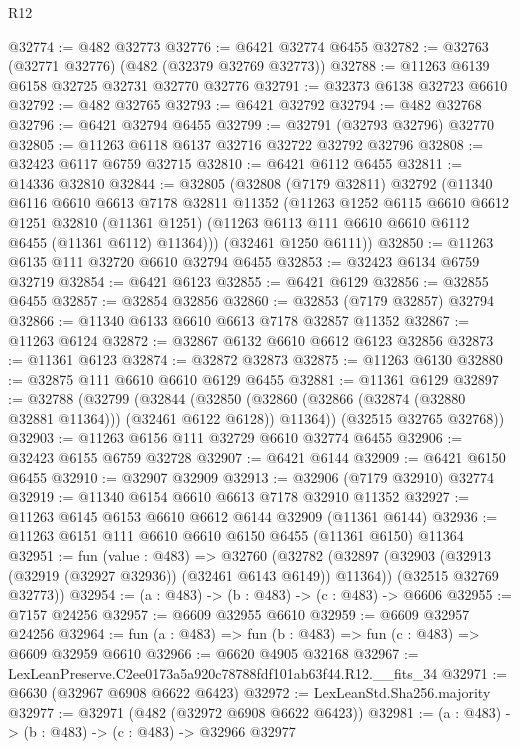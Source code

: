 \begin{lexlean}{R12}
\begin{coremodule}
@32774 := @482 @32773
@32776 := @6421 @32774 @6455
@32782 := @32763 (@32771 @32776) (@482 (@32379 @32769 @32773))
@32788 := @11263 @6139 @6158 @32725 @32731 @32770 @32776
@32791 := @32373 @6138 @32723 @6610
@32792 := @482 @32765
@32793 := @6421 @32792
@32794 := @482 @32768
@32796 := @6421 @32794 @6455
@32799 := @32791 (@32793 @32796) @32770
@32805 := @11263 @6118 @6137 @32716 @32722 @32792 @32796
@32808 := @32423 @6117 @6759 @32715
@32810 := @6421 @6112 @6455
@32811 := @14336 @32810
@32844 := @32805
    (@32808
      (@7179 @32811)
      @32792
      (@11340
        @6116
        @6610
        @6613
        @7178
        @32811
        @11352
        (@11263
          @1252
          @6115
          @6610
          @6612
          @1251
          @32810
          (@11361 @1251)
          (@11263 @6113 @111 @6610 @6610 @6112 @6455 (@11361 @6112) @11364)))
      (@32461 @1250 @6111))
@32850 := @11263 @6135 @111 @32720 @6610 @32794 @6455
@32853 := @32423 @6134 @6759 @32719
@32854 := @6421 @6123
@32855 := @6421 @6129
@32856 := @32855 @6455
@32857 := @32854 @32856
@32860 := @32853 (@7179 @32857) @32794
@32866 := @11340 @6133 @6610 @6613 @7178 @32857 @11352
@32867 := @11263 @6124
@32872 := @32867 @6132 @6610 @6612 @6123 @32856
@32873 := @11361 @6123
@32874 := @32872 @32873
@32875 := @11263 @6130
@32880 := @32875 @111 @6610 @6610 @6129 @6455
@32881 := @11361 @6129
@32897 := @32788
    (@32799
      (@32844
        (@32850 (@32860 (@32866 (@32874 (@32880 @32881 @11364))) (@32461 @6122 @6128)) @11364))
      (@32515 @32765 @32768))
@32903 := @11263 @6156 @111 @32729 @6610 @32774 @6455
@32906 := @32423 @6155 @6759 @32728
@32907 := @6421 @6144
@32909 := @6421 @6150 @6455
@32910 := @32907 @32909
@32913 := @32906 (@7179 @32910) @32774
@32919 := @11340 @6154 @6610 @6613 @7178 @32910 @11352
@32927 := @11263 @6145 @6153 @6610 @6612 @6144 @32909 (@11361 @6144)
@32936 := @11263 @6151 @111 @6610 @6610 @6150 @6455 (@11361 @6150) @11364
@32951 := fun (value : @483) =>
  @32760
    (@32782
      (@32897 (@32903 (@32913 (@32919 (@32927 @32936)) (@32461 @6143 @6149)) @11364))
      (@32515 @32769 @32773))
@32954 := (a : @483) -> (b : @483) -> (c : @483) -> @6606
@32955 := @7157 @24256
@32957 := @6609 @32955 @6610
@32959 := @6609 @32957 @24256
@32964 := fun (a : @483) => fun (b : @483) => fun (c : @483) => @6609 @32959 @6610
@32966 := @6620 @4905 @32168
@32967 := LexLeanPreserve.C2ee0173a5a920c78788fdf101ab63f44.R12.__fits_34
@32971 := @6630 (@32967 @6908 @6622 @6423)
@32972 := LexLeanStd.Sha256.majority
@32977 := @32971 (@482 (@32972 @6908 @6622 @6423))
@32981 := (a : @483) -> (b : @483) -> (c : @483) -> @32966 @32977

\end{coremodule}
\end{lexlean}
